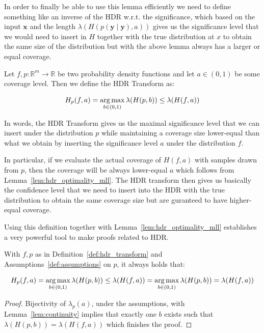 In order to finally be able to use this lemma efficiently we need to define something like an inverse of the HDR w.r.t. the significance, which based on the input $\mathbf{x}$ and the length $\lambda(H(p(\mathbf{y} \mid \mathbf{y}), a))$ gives us the significance level that we would need to insert in $H$ together with the true distribution at $x$ to obtain the same size of the distribution but with the above lemma always has a larger or equal coverage.

\begin{definition}\label{def:hdr_transform}
    Let $f,p : \mathbb{R}^m \to \mathbb{R}$ be two probability density functions and let $a \in (0,1)$ be some coverage level. Then we define the HDR Transform as:

    \[
        H_p(f, a) = \operatorname*{arg\,max}_{b \in (0,1)} \lambda(H(p, b)) \leq \lambda(H(f, a))
    \]

\end{definition}
In words, the HDR Transform gives us the maximal significance level that we can insert under the distribution $p$ while maintaining a coverage size lower-equal than what we obtain by inserting the significance level $a$ under the distribution $f$. 

In particular, if we evaluate the actual coverage of $H(f, a)$ with samples drawn from $p$, then the coverage will be always lower-equal $a$ which follows from Lemma~\ref{lem:hdr_optimality_mll}. The HDR transform then gives us basically the confidence level that we need to insert into the HDR with the true distribution to obtain the same coverage size but are guranteed to have higher-equal coverage.

Using this definition together with Lemma~\ref{lem:hdr_optimality_mll} establishes a very powerful tool to make proofs related to HDR.

\begin{lemma}\label{lem:hdr_optimality}
    With $f,p$ as in Definition~\ref{def:hdr_transform} and Assumptions~\ref{def:assumptions} on $p$, it always holds that:

    \begin{equation}
        H_p(f, a) = \operatorname*{arg\,max}_{b \in (0,1)} \lambda(H(p, b)) \leq \lambda(H(f, a)) = \operatorname*{arg\,max}_{b \in (0,1)} \lambda(H(p, b)) = \lambda(H(f, a))
    \end{equation}
\end{lemma}
\begin{proof}
    Bijectivity of $\lambda_p(a)$, under the assumptions, with Lemma~\ref{lem:continuity} implies that exactly one $b$ exists such that $\lambda(H(p, b)) = \lambda(H(f, a))$ which finishes the proof. 
\end{proof}


